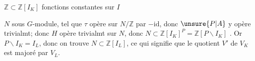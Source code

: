 
$\mathbb Z\subset\mathbb Z[I_K]$ fonctions constantes sur $I$


$N$ sous $G$-module, tel que $\tau$ opère sur $N/\mathbb Z$ par $-\mathrm{id}$,
donc $\unsure{P|A}$ y opère trivialmt; donc $H$ opère trivialmt sur $N$, donc
$N\subset\mathbb Z[I_K]^P=\mathbb Z[P\backslash I_K]$
.
Or $P\backslash I_K=I_L$, donc on trouve \deleted{$\unsure{\subset}$}
$N\subset\mathbb Z[I_L]$, ce qui signifie que le quotient $V'$ de $V_K$ est majoré par $V_L$.

